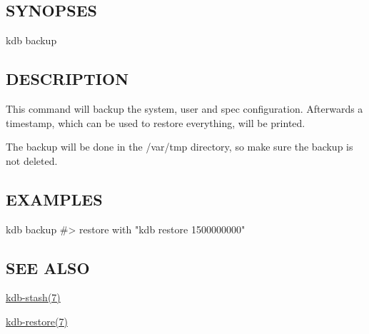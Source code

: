 \subsection*{S\+Y\+N\+O\+P\+S\+ES}

{\ttfamily kdb backup}

\subsection*{D\+E\+S\+C\+R\+I\+P\+T\+I\+ON}

This command will backup the {\ttfamily system}, {\ttfamily user} and {\ttfamily spec} configuration. Afterwards a timestamp, which can be used to restore everything, will be printed.

The backup will be done in the {\ttfamily /var/tmp} directory, so make sure the backup is not deleted.

\subsection*{E\+X\+A\+M\+P\+L\+ES}


\begin{DoxyCode}
kdb backup
#> restore with "kdb restore 1500000000"
\end{DoxyCode}


\subsection*{S\+EE A\+L\+SO}


\begin{DoxyItemize}
\item \hyperlink{doc_help_kdb-stash_md}{kdb-\/stash(7)}
\item \hyperlink{doc_help_kdb-restore_md}{kdb-\/restore(7)} 
\end{DoxyItemize}